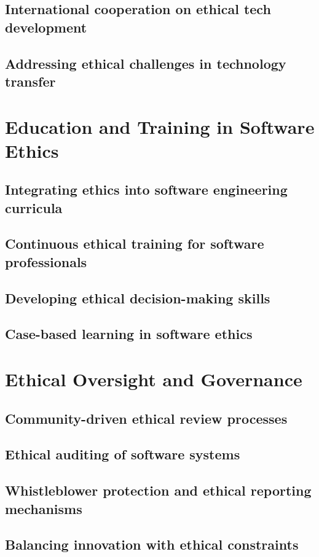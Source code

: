 \subsection{International cooperation on ethical tech development}
\subsection{Addressing ethical challenges in technology transfer}

\newpage

\section{Education and Training in Software Ethics}
\subsection{Integrating ethics into software engineering curricula}
\subsection{Continuous ethical training for software professionals}
\subsection{Developing ethical decision-making skills}
\subsection{Case-based learning in software ethics}

\newpage

\section{Ethical Oversight and Governance}
\subsection{Community-driven ethical review processes}
\subsection{Ethical auditing of software systems}
\subsection{Whistleblower protection and ethical reporting mechanisms}
\subsection{Balancing innovation with ethical constraints}

